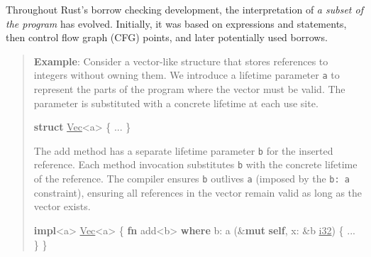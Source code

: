 \documentclass[
  11pt,
  twoside]{report}
\newenvironment{Shaded}{}{}
\newcommand{\DataTypeTok}[1]{\underline{#1}}
\newcommand{\KeywordTok}[1]{\textbf{#1}}
\newcommand{\NormalTok}[1]{#1}
\newcommand{\OperatorTok}[1]{#1}
\newcommand{\OtherTok}[1]{#1}
\begin{document}
Throughout Rust's borrow checking development, the interpretation of
\emph{a subset of the program} has evolved. Initially, it was based on
expressions and statements, then control flow graph (CFG) points, and
later potentially used borrows.

\begin{quote}
\textbf{Example}: Consider a vector-like structure that stores
references to integers without owning them. We introduce a lifetime
parameter \texttt{\textquotesingle{}a} to represent the parts of the
program where the vector must be valid. The parameter is substituted
with a concrete lifetime at each use site.

\begin{Shaded}
\begin{Highlighting}[]
\KeywordTok{struct} \DataTypeTok{Vec}\OperatorTok{\textless{}}\OtherTok{\textquotesingle{}a}\OperatorTok{\textgreater{}} \OperatorTok{\{} \OperatorTok{...} \OperatorTok{\}}
\end{Highlighting}
\end{Shaded}

The add method has a separate lifetime parameter
\texttt{\textquotesingle{}b} for the inserted reference. Each method
invocation substitutes \texttt{\textquotesingle{}b} with the concrete
lifetime of the reference. The compiler ensures
\texttt{\textquotesingle{}b} outlives \texttt{\textquotesingle{}a}
(imposed by the \texttt{\textquotesingle{}b:\ \textquotesingle{}a}
constraint), ensuring all references in the vector remain valid as long
as the vector exists.

\begin{Shaded}
\begin{Highlighting}[]
\KeywordTok{impl}\OperatorTok{\textless{}}\OtherTok{\textquotesingle{}a}\OperatorTok{\textgreater{}} \DataTypeTok{Vec}\OperatorTok{\textless{}}\OtherTok{\textquotesingle{}a}\OperatorTok{\textgreater{}} \OperatorTok{\{}
  \KeywordTok{fn}\NormalTok{ add}\OperatorTok{\textless{}}\OtherTok{\textquotesingle{}b}\OperatorTok{\textgreater{}} \KeywordTok{where} \OtherTok{\textquotesingle{}b}\OperatorTok{:} \OtherTok{\textquotesingle{}a}\NormalTok{ (}\OperatorTok{\&}\KeywordTok{mut} \KeywordTok{self}\OperatorTok{,}\NormalTok{ x}\OperatorTok{:} \OperatorTok{\&}\OtherTok{\textquotesingle{}b} \DataTypeTok{i32}\NormalTok{) }\OperatorTok{\{} \OperatorTok{...} \OperatorTok{\}}
\OperatorTok{\}}
\end{Highlighting}
\end{Shaded}
\end{quote}
\end{document}

